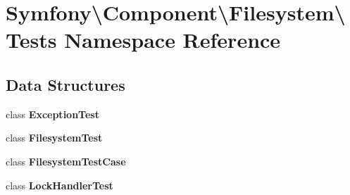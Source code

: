 \section{Symfony\textbackslash{}Component\textbackslash{}Filesystem\textbackslash{}Tests Namespace Reference}
\label{namespace_symfony_1_1_component_1_1_filesystem_1_1_tests}
\subsection*{Data Structures}
\begin{DoxyCompactItemize}
\item 
class {\bf Exception\+Test}
\item 
class {\bf Filesystem\+Test}
\item 
class {\bf Filesystem\+Test\+Case}
\item 
class {\bf Lock\+Handler\+Test}
\end{DoxyCompactItemize}
